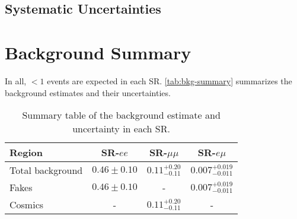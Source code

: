 \subsection{Systematic Uncertainties}

\section{Background Summary}

In all, $<1$ events are expected in each \ac{SR}. \autoref{tab:bkg-summary} summarizes the background estimates and their uncertainties.

\begin{table}
\centering
\begin{tabular}{lccc}
Region 			 & SR-$ee$ 			& SR-$\mu\mu$ 				& SR-$e\mu$ \\
\hline
Total background & $0.46 \pm 0.10$ 	& $0.11 ^{+0.20}_{-0.11}$	& $0.007^{+0.019}_{-0.011}$\\
\hline
Fakes 			 & $0.46 \pm 0.10$ 	& - 						& $0.007^{+0.019}_{-0.011}$\\
Cosmics 		 & - 				& $0.11 ^{+0.20}_{-0.11}$ 	& - \\
\hline
\end{tabular}
\caption{Summary table of the background estimate and uncertainty in each \ac{SR}.}
\label{tab:bkg-summary}
\end{table}





